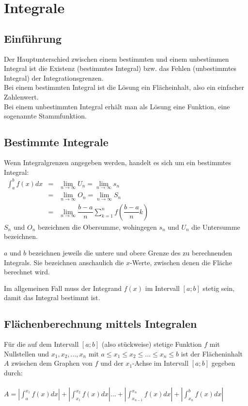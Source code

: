 \chapter{Integrale}
\section{Einführung}
Der Hauptunterschied zwischen einem bestimmten und einem unbestimmen Integral ist die Existenz (bestimmtes Integral) bzw. das Fehlen
(unbestimmtes Integral) der Integrationsgrenzen.\\
Bei einem bestimmten Integral ist die Lösung ein Flächeinhalt, also ein einfacher Zahlenwert.\\
Bei einem unbestimmten Integral erhält man als Lösung eine Funktion, eine sogenannte Stammfunktion.\\


\section{Bestimmte Integrale}
\begin{Definition}
  Wenn Integralgrenzen angegeben werden, handelt es sich um ein bestimmtes Integral:\\
  $
  \begin{array}{rcl}
    \int_{a}^{b} f(x)dx & = & \lim\limits_{n \rightarrow \infty} U_n = \lim\limits_{n \rightarrow \infty} s_n\\
                         & = & \lim\limits_{n \rightarrow \infty} O_n = \lim\limits_{n \rightarrow \infty} S_n\\
                         & = & \lim\limits_{n \rightarrow \infty} \dfrac{b-a}{n}\sum\limits_{k=1}^{n}f(\dfrac{b-a}{n}k)
  \end{array}
  $\\
  $S_n$ und $O_n$ bezeichnen die Obersumme, wohingegen $s_n$ und $U_n$ die Untersumme bezeichnen.
\end{Definition}
\begin{Bemerkung}
  $a$ und $b$ bezeichnen jeweils die untere und obere Grenze des zu berechnenden Integrals. Sie bezeichnen anschaulich die $x$-Werte, zwischen denen die Fläche berechnet wird.
\end{Bemerkung}
\begin{Bemerkung}
  Im allgemeinen Fall muss der Integrand $f(x)$ im Intervall $[a;b]$ stetig sein, damit das Integral bestimmt ist.
\end{Bemerkung}
\section{Flächenberechnung mittels Integralen}
\begin{Definition}
  Für die auf dem Intervall $[a;b]$ (also stückweise) stetige Funktion $f$ mit Nullstellen und $x_1,x_2,...,x_n$
  mit $a \leq x_1 \leq x_2 \leq ... \leq x_n \leq b$ ist der Flächeninhalt $A$ zwischen dem Graphen von $f$ und
  der $x_1$-Achse im Intervall $[a;b]$ gegeben durch:\\\\
  $A= |{\int_a^{x_1} f(x)dx}|+|{\int_{x_1}^{x_2} f(x)dx}|...+|{\int_{x_{n-1}}^{x_n} f(x)dx}|+|{\int_{x_n}^b f(x)dx}|$
\end{Definition}
